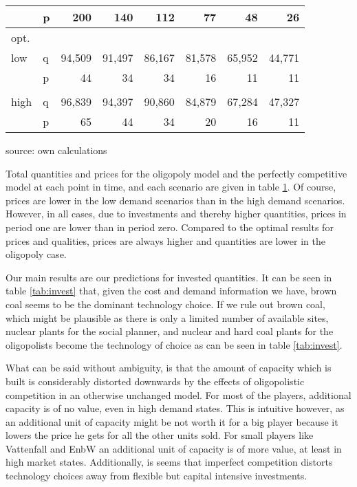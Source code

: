 \begin{table}
\begin{tabular}{llrrrrrr}
           &          p &        200 &        140 &        112 &         77 &         48 &         26 \\
\hline
   opt. &            &            &            &            &            &            &            \\
       low &          q &     94,509 &     91,497 &     86,167 &     81,578 &     65,952 &     44,771 \\
           &          p &         44 &         34 &         34 &         16 &         11 &         11 \\
           &            &            &            &            &            &            &            \\
      high &          q &     96,839 &     94,397 &     90,860 &     84,879 &     67,284 &     47,327 \\
           &          p &         65 &         44 &         34 &         20 &         16 &         11 \\
\hline
\hline
\end{tabular}  

\label{tab:dynquant}
\begin{center}
source: own calculations
\end{center}
\end{table}

Total quantities and prices for the oligopoly model and the perfectly competitive model at each point in time, and each scenario are given in table \ref{tab:dynquant}. Of course, prices are lower in the low demand scenarios than in the high demand scenarios. However, in all cases, due to investments and thereby higher quantities, prices in period one are lower than in period zero.
Compared to the optimal results for prices and qualities, prices are always higher and quantities are lower in the oligopoly case.

Our main results are our predictions for invested quantities. It can be seen in table \ref{tab:invest} that, given the cost and demand information we have, brown coal seems to be the dominant technology choice. If we rule out brown coal, which might be plausible as there is only a limited number of available sites, nuclear plants for the social planner, and nuclear and hard coal plants for the oligopolists become the technology of choice as can be seen in table \ref{tab:invest}.

What can be said without ambiguity, is that the amount of capacity which is built is considerably distorted downwards by the effects of oligopolistic competition in an otherwise unchanged model. For most of the players, additional capacity is of no value, even in high demand states. This is intuitive however, as an additional unit of capacity might be not worth it for a big player because it lowers the price he gets for all the other units sold. For small players like Vattenfall and EnbW an additional unit of capacity is of more value, at least in high market states. Additionally, is seems that imperfect competition distorts technology choices away from flexible but capital intensive investments.

